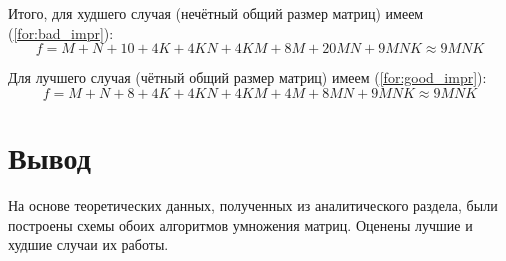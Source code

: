 Итого, для худшего случая (нечётный общий размер матриц) имеем (\ref{for:bad_impr}):
\begin{equation}
    \label{for:bad_impr}
    f = M + N + 10 + 4K + 4KN + 4KM + 8M + 20MN + 9MNK \approx 9MNK
\end{equation}

Для лучшего случая (чётный общий размер матриц) имеем (\ref{for:good_impr}):
\begin{equation}
    \label{for:good_impr}
    f = M + N + 8 + 4K +4KN + 4KM + 4M + 8MN + 9MNK \approx 9MNK
\end{equation}


\section*{Вывод}

На основе теоретических данных, полученных из аналитического раздела, были построены схемы обоих алгоритмов умножения матриц.
Оценены лучшие и худшие случаи их работы.
